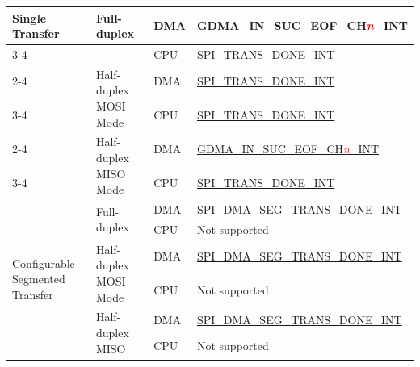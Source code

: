 \documentclass[main\_\_EN.tex]{subfiles}
\begin{document}
\begin{ThreePartTable}
\begin{longtable}[c]{|l|l|l|l|}
\multirow{6}{*}{Single Transfer} & \multirow{2}{*}{Full-duplex} & DMA & \hyperref[int:GDMAINSUCEOFINT]{GDMA\_IN\_SUC\_EOF\_CH\textcolor{red}{\it{n}}\_INT} \tnote{1} \\ \cline{3-4}
&& CPU & \hyperref[int:SPITRANSDONEINT]{SPI\_TRANS\_DONE\_INT} \tnote{2}  \\ \cline{2-4}
& \multirow{2}{*}{Half-duplex MOSI Mode} & DMA & \hyperref[int:SPITRANSDONEINT]{SPI\_TRANS\_DONE\_INT} \\ \cline{3-4}
&& CPU & \hyperref[int:SPITRANSDONEINT]{SPI\_TRANS\_DONE\_INT}  \\ \cline{2-4}
& \multirow{2}{*}{Half-duplex MISO Mode} & DMA & \hyperref[int:GDMAINSUCEOFINT]{GDMA\_IN\_SUC\_EOF\_CH\textcolor{red}{\it{n}}\_INT} \\ \cline{3-4}
&& CPU & \hyperref[int:SPITRANSDONEINT]{SPI\_TRANS\_DONE\_INT} \\ \hline
\multirow{6}{*}{Configurable Segmented Transfer} & \multirow{2}{*}{Full-duplex} & DMA & \hyperref[int:SPIDMASEGTRANSDONEINT]{SPI\_DMA\_SEG\_TRANS\_DONE\_INT} \tnote{3} \\ \cline{3-4}
&& CPU & Not supported       \\ \cline{2-4}
& \multirow{2}{*}{Half-duplex MOSI Mode} & DMA  & \hyperref[int:SPIDMASEGTRANSDONEINT]{SPI\_DMA\_SEG\_TRANS\_DONE\_INT} \\ \cline{3-4}
&& CPU           & Not supported       \\ \cline{2-4}
& \multirow{2}{*}{Half-duplex MISO} & DMA & \hyperref[int:SPIDMASEGTRANSDONEINT]{SPI\_DMA\_SEG\_TRANS\_DONE\_INT} \\ \cline{3-4}
&& CPU & Not supported       \\ \hline
\end{longtable}
\end{ThreePartTable}
\end{document}
